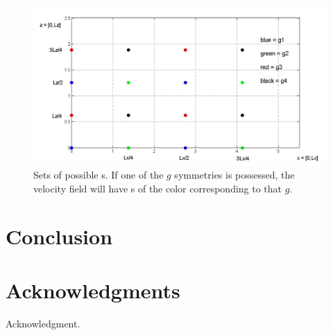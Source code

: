 \documentclass[letter,10pt,openany]{article}
\begin{document}
\begin{figure}[!h]
\includegraphics[width=1.2\textwidth]{stags7_26.jpg}
  \caption{
   Sets of possible \stagp s. If one of the $g$ symmetries is
   possessed, the velocity field will have \stagp s of the color
   corresponding to that $g$.
   }
  \label{eltonFig:stags7_26}
 \end{figure}



\section{Conclusion}
\label{sec:intro}


\section{Acknowledgments}
Acknowledgment. 







  \renewcommand{\ssp}{a}            %
  \renewcommand\xInit{{a_0}}        %
  \renewcommand{\deltaX}{{\delta a}}    %
  \renewcommand\velField[1]{{F(#1)}}    %
  \renewcommand\velField[1]{{u(#1)}}    %
\end{document}
